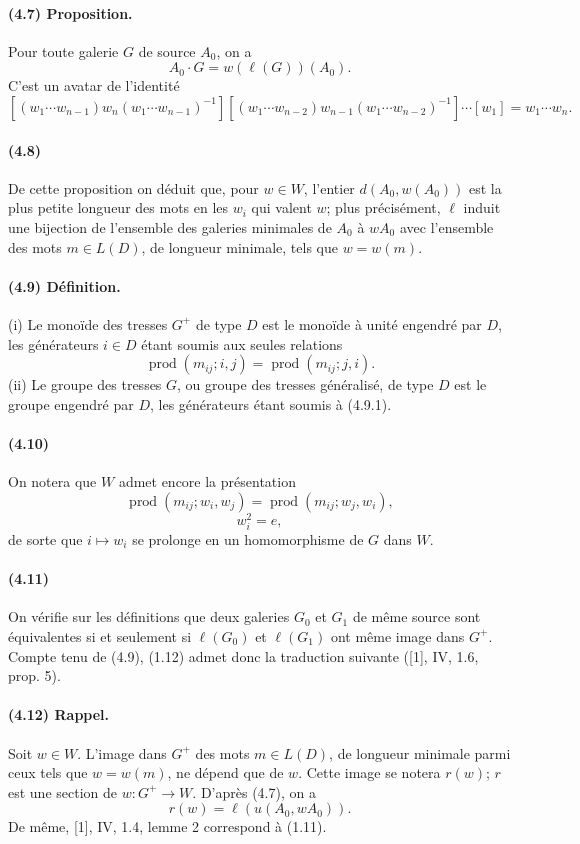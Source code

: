 \documentclass[10pt]{article}
\newcommand{\prodalt}{\operatorname{prod}}
\begin{document}
\paragraph{(4.7) Proposition.} Pour toute galerie \(G\) de source \(A_0\), on a
\[
A_0\cdot G=w(\ell(G))(A_0).
\]
C'est un avatar de l'identité
\[
[(w_1\cdots w_{n-1})w_n(w_1\cdots w_{n-1})^{-1}]
[(w_1\cdots w_{n-2})w_{n-1}(w_1\cdots w_{n-2})^{-1}]
\cdots [w_1]=w_1\cdots w_n.
\]

\paragraph{(4.8)} De cette proposition on déduit que, pour \(w\in W\), l'entier \(d(A_0,w(A_0))\) est la plus petite longueur des mots en les \(w_i\) qui valent \(w\); plus précisément, \(\ell\) induit une bijection de l'ensemble des galeries minimales de \(A_0\) à \(wA_0\) avec l'ensemble des mots \(m\in L(D)\), de longueur minimale, tels que \(w=w(m)\).

\paragraph{(4.9) Définition.} (i) Le monoïde des tresses \(G^+\) de type \(D\) est le monoïde à unité engendré par \(D\), les générateurs \(i\in D\) étant soumis aux seules relations
\[
\tag{4.9.1}
\prodalt(m_{ij};i,j)=\prodalt(m_{ij};j,i).
\]
(ii) Le groupe des tresses \(G\), ou groupe des tresses généralisé, de type \(D\) est le groupe engendré par \(D\), les générateurs étant soumis à (4.9.1).

\paragraph{(4.10)} On notera que \(W\) admet encore la présentation
\[
\tag{4.10.1}
\prodalt(m_{ij};w_i,w_j)=\prodalt(m_{ij};w_j,w_i),
\]
\[
\tag{4.10.2}
w_i^2=e,
\]
de sorte que \(i\mapsto w_i\) se prolonge en un homomorphisme de \(G\) dans \(W\).

\paragraph{(4.11)} On vérifie sur les définitions que deux galeries \(G_0\) et \(G_1\) de même source sont équivalentes si et seulement si \(\ell(G_0)\) et \(\ell(G_1)\) ont même image dans \(G^+\). Compte tenu de (4.9), (1.12) admet donc la traduction suivante ([1], IV, 1.6, prop. 5).

\paragraph{(4.12) Rappel.} Soit \(w\in W\). L'image dans \(G^+\) des mots \(m\in L(D)\), de longueur minimale parmi ceux tels que \(w=w(m)\), ne dépend que de \(w\). Cette image se notera \(r(w)\); \(r\) est une section de \(w:G^+\to W\). D'après (4.7), on a
\[
r(w)=\ell(u(A_0,wA_0)).
\]
De même, [1], IV, 1.4, lemme 2 correspond à (1.11).
\end{document}
